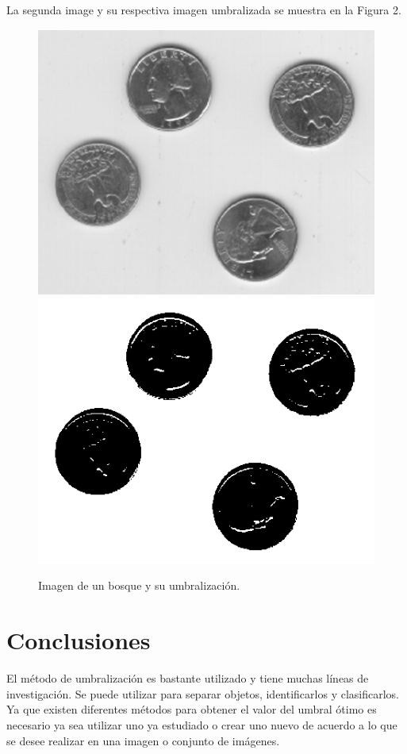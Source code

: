 \documentclass[conference]{IEEEtran}
\begin{document}
La segunda image y su respectiva imagen umbralizada se muestra en la Figura 2.
\begin{figure}[h]
	\begin{center}
		\setlength{\unitlength}{0.00105in}
		\includegraphics[scale=0.23]{./images/eight.png}
		\includegraphics[scale=0.30]{./images/IMG1.png}
	\end{center}
	\caption{Imagen de un bosque y su umbralizaci\'on.}
\end{figure}

\section{Conclusiones}
El m\'etodo de umbralizaci\'on es bastante utilizado y tiene muchas l\'ineas de investigaci\'on. Se puede utilizar para separar objetos, identificarlos y clasificarlos. Ya que existen diferentes m\'etodos para obtener el valor del umbral \'otimo es necesario ya sea utilizar uno ya estudiado o crear uno nuevo de acuerdo a lo que se desee realizar en una imagen o conjunto de im\'agenes.
\end{document}
